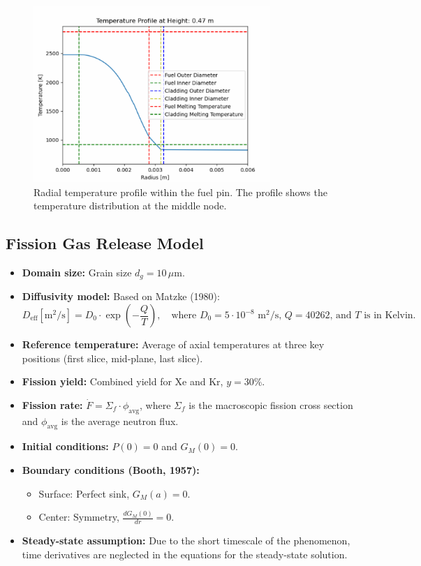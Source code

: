 \documentclass[11pt,a4paper,twoside]{article}
\begin{document}
\begin{figure}[H]
    \centering
    \includegraphics[width=0.8\textwidth]{temperature_profile.png}
    \caption{Radial temperature profile within the fuel pin. The profile shows the temperature distribution at the middle node.}
    \label{fig:Temperature_Profile}
\end{figure}

\subsection{Fission Gas Release Model}
\begin{itemize}
    \item \textbf{Domain size:} Grain size $d_g = 10 \, \mu \text{m}$.
    \item \textbf{Diffusivity model:} Based on Matzke (1980):
    \[
    D_{\text{eff}} [\text{m}^2/\text{s}] = D_0 \cdot \exp\left(-\frac{Q}{T}\right), \quad \text{where } D_0 = 5 \cdot 10^{-8} \text{ m}^2/\text{s}, \, Q = 40262 \text{, and } T \text{ is in Kelvin.}
    \]
    \item \textbf{Reference temperature:} Average of axial temperatures at three key positions (first slice, mid-plane, last slice).
    \item \textbf{Fission yield:} Combined yield for Xe and Kr, $y = 30\%$.
    \item \textbf{Fission rate:} $\dot{F} = \Sigma_f \cdot \phi_{\text{avg}}$, where $\Sigma_f$ is the macroscopic fission cross section and $\phi_{\text{avg}}$ is the average neutron flux.
    \item \textbf{Initial conditions:} $P(0) = 0$ and $G_M(0) = 0$.
    \item \textbf{Boundary conditions (Booth, 1957):}
    \begin{itemize}
        \item Surface: Perfect sink, $G_M(a) = 0$.
        \item Center: Symmetry, $\frac{dG_M(0)}{dr} = 0$.
    \end{itemize}
    \item \textbf{Steady-state assumption:} Due to the short timescale of the phenomenon, time derivatives are neglected in the equations for the steady-state solution.
\end{itemize}
    
\end{document}
